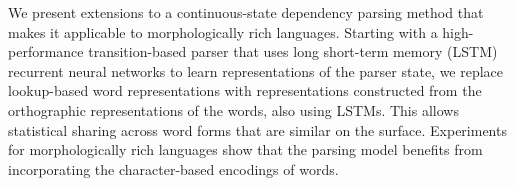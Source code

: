 We present extensions to a continuous-state dependency parsing method that makes it applicable to morphologically rich languages. Starting with a high-performance transition-based parser that uses long short-term memory (LSTM) recurrent neural networks to learn representations of the parser state, we replace lookup-based word representations with representations constructed from the orthographic representations of the words, also using LSTMs. This allows statistical sharing across word forms that are similar on the surface. Experiments for morphologically rich languages show that the parsing model benefits from incorporating the character-based encodings of words.
